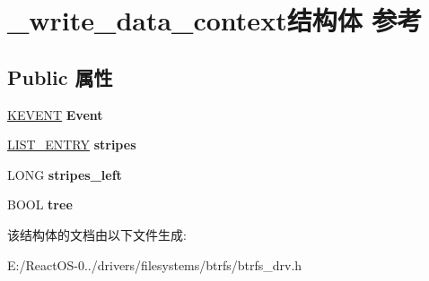 \hypertarget{struct__write__data__context}{}\section{\+\_\+write\+\_\+data\+\_\+context结构体 参考}
\label{struct__write__data__context}
\subsection*{Public 属性}
\begin{DoxyCompactItemize}
\item 
\mbox{\label{struct__write__data__context_a63b2e13f6d7d0f13e67704897b8e2a57}} 
\hyperlink{struct___k_e_v_e_n_t}{K\+E\+V\+E\+NT} {\bfseries Event}
\item 
\mbox{\label{struct__write__data__context_a3285e8c9c13b0419d110bf06ba312bb0}} 
\hyperlink{struct___l_i_s_t___e_n_t_r_y}{L\+I\+S\+T\+\_\+\+E\+N\+T\+RY} {\bfseries stripes}
\item 
\mbox{\label{struct__write__data__context_ad56d0fc74f90c5ff34e51fe2081994e9}} 
L\+O\+NG {\bfseries stripes\+\_\+left}
\item 
\mbox{\label{struct__write__data__context_aa284f6463c49220f17ddbf50c72a2d2d}} 
B\+O\+OL {\bfseries tree}
\end{DoxyCompactItemize}


该结构体的文档由以下文件生成\+:\begin{DoxyCompactItemize}
\item 
E\+:/\+React\+O\+S-\/0../drivers/filesystems/btrfs/btrfs\+\_\+drv.\+h\end{DoxyCompactItemize}
